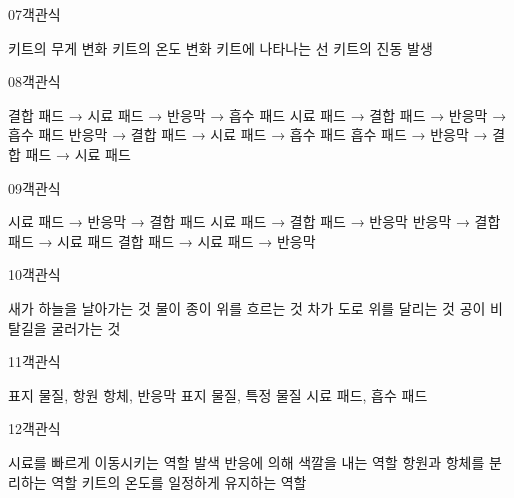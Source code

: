 \documentclass[fs9,seriesRus]{korfarm-base}
\begin{document}
\begin{kfQBlock}{07}{객관식}
\begin{kfChoices}
\kfChoice 키트의 무게 변화
\kfChoice 키트의 온도 변화
\kfChoice 키트에 나타나는 선
\kfChoice 키트의 진동 발생
\end{kfChoices}
\end{kfQBlock}
\begin{kfQBlock}{08}{객관식}
\begin{kfChoices}
\kfChoice 결합 패드 → 시료 패드 → 반응막 → 흡수 패드
\kfChoice 시료 패드 → 결합 패드 → 반응막 → 흡수 패드
\kfChoice 반응막 → 결합 패드 → 시료 패드 → 흡수 패드
\kfChoice 흡수 패드 → 반응막 → 결합 패드 → 시료 패드
\end{kfChoices}
\end{kfQBlock}
\begin{kfQBlock}{09}{객관식}
\begin{kfChoices}
\kfChoice 시료 패드 → 반응막 → 결합 패드
\kfChoice 시료 패드 → 결합 패드 → 반응막
\kfChoice 반응막 → 결합 패드 → 시료 패드
\kfChoice 결합 패드 → 시료 패드 → 반응막
\end{kfChoices}
\end{kfQBlock}
\begin{kfQBlock}{10}{객관식}
\begin{kfChoices}
\kfChoice 새가 하늘을 날아가는 것
\kfChoice 물이 종이 위를 흐르는 것
\kfChoice 차가 도로 위를 달리는 것
\kfChoice 공이 비탈길을 굴러가는 것
\end{kfChoices}
\end{kfQBlock}
\begin{kfQBlock}{11}{객관식}
\begin{kfChoices}
\kfChoice 표지 물질, 항원
\kfChoice 항체, 반응막
\kfChoice 표지 물질, 특정 물질
\kfChoice 시료 패드, 흡수 패드
\end{kfChoices}
\end{kfQBlock}
\begin{kfQBlock}{12}{객관식}
\begin{kfChoices}
\kfChoice 시료를 빠르게 이동시키는 역할
\kfChoice 발색 반응에 의해 색깔을 내는 역할
\kfChoice 항원과 항체를 분리하는 역할
\kfChoice 키트의 온도를 일정하게 유지하는 역할
\end{kfChoices}
\end{kfQBlock}
\end{document}
